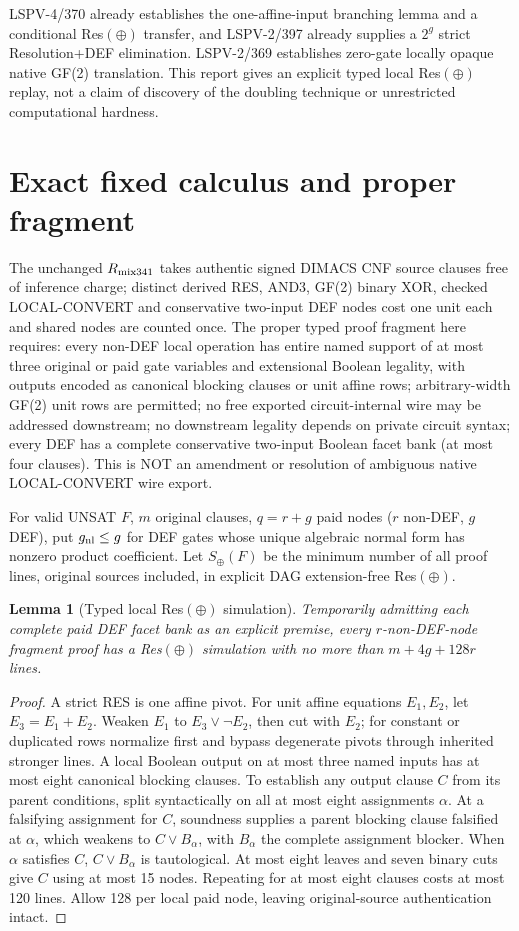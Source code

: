\documentclass[11pt]{article}
\newtheorem{lemma}[theorem]{Lemma}
\begin{document}
LSPV-4/370 already establishes the one-affine-input branching lemma and a conditional Res$(\oplus)$ transfer, and LSPV-2/397 already supplies a $2^g$ strict Resolution+DEF elimination. LSPV-2/369 establishes zero-gate locally opaque native GF(2) translation. This report gives an explicit typed local Res$(\oplus)$ replay, not a claim of discovery of the doubling technique or unrestricted computational hardness.

\section*{Exact fixed calculus and proper fragment}
The unchanged $R_{\rm mix341}$ takes authentic signed DIMACS CNF source clauses free of inference charge; distinct derived RES, AND3, GF(2) binary XOR, checked LOCAL-CONVERT and conservative two-input DEF nodes cost one unit each and shared nodes are counted once. The proper typed proof fragment here requires: every non-DEF local operation has entire named support of at most three original or paid gate variables and extensional Boolean legality, with outputs encoded as canonical blocking clauses or unit affine rows; arbitrary-width GF(2) unit rows are permitted; no free exported circuit-internal wire may be addressed downstream; no downstream legality depends on private circuit syntax; every DEF has a complete conservative two-input Boolean facet bank (at most four clauses). This is NOT an amendment or resolution of ambiguous native LOCAL-CONVERT wire export.

For valid UNSAT $F$, $m$ original clauses, $q=r+g$ paid nodes ($r$ non-DEF, $g$ DEF), put $g_{\rm nl}\le g$ for DEF gates whose unique algebraic normal form has nonzero product coefficient. Let $S_\oplus(F)$ be the minimum number of all proof lines, original sources included, in explicit DAG extension-free Res$(\oplus)$.

\begin{lemma}[Typed local Res$(\oplus)$ simulation]
Temporarily admitting each complete paid DEF facet bank as an explicit premise, every $r$-non-DEF-node fragment proof has a Res$(\oplus)$ simulation with no more than $m+4g+128r$ lines.
\end{lemma}
\begin{proof}
A strict RES is one affine pivot. For unit affine equations $E_1,E_2$, let $E_3=E_1+E_2$. Weaken $E_1$ to $E_3\lor\neg E_2$, then cut with $E_2$; for constant or duplicated rows normalize first and bypass degenerate pivots through inherited stronger lines. A local Boolean output on at most three named inputs has at most eight canonical blocking clauses. To establish any output clause $C$ from its parent conditions, split syntactically on all at most eight assignments $\alpha$. At a falsifying assignment for $C$, soundness supplies a parent blocking clause falsified at $\alpha$, which weakens to $C\lor B_\alpha$, with $B_\alpha$ the complete assignment blocker. When $\alpha$ satisfies $C$, $C\lor B_\alpha$ is tautological. At most eight leaves and seven binary cuts give $C$ using at most 15 nodes. Repeating for at most eight clauses costs at most 120 lines. Allow 128 per local paid node, leaving original-source authentication intact.
\end{proof}
\end{document}
